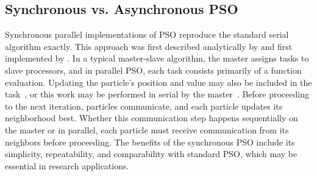 \documentclass[ms]{byuprop}
\begin{document}
\subsection{Synchronous vs. Asynchronous PSO}

Synchronous parallel implementations of PSO reproduce the standard serial
algorithm exactly.  This approach was first described analytically by
\citet{belal-2004-parallel-models-for-pso} and first implemented by
\citet{schutte-2004-parallel-global-optimization-with-pso}.  In a typical
master-slave algorithm, the master assigns tasks to slave processors, and in
parallel PSO, each task consists primarily of a function evaluation.  Updating
the particle's position and value may also be included in the
task~\citep{belal-2004-parallel-models-for-pso}, or this work may be performed
in serial by the
master~\citep{schutte-2004-parallel-global-optimization-with-pso}.  Before
proceeding to the next iteration, particles communicate, and each particle
updates its neighborhood best.  Whether this communication step happens
sequentially on the master or in parallel, each particle must receive
communication from its neighbors before proceeding.  The benefits of the
synchronous PSO include its simplicity, repeatability, and comparability with
standard PSO, which may be essential in research applications.
\end{document}
